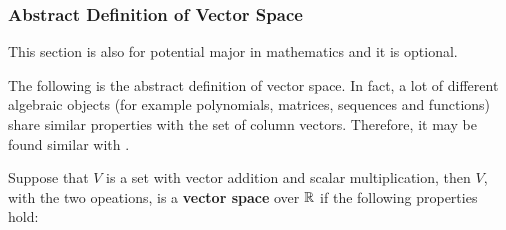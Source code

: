 \documentclass[a4paper,12pt]{article}
\begin{document}
\subsubsection{Abstract Definition of Vector Space}
\begin{cmt}
  This section is also for potential major in mathematics and it is optional.
\end{cmt}\n

The following is the abstract definition of vector space. In fact, a lot of different algebraic objects (for example polynomials, matrices, sequences and functions) share similar properties with the set of column vectors. Therefore, it may be found similar with \rpst[\sctd{1}].\n

\begin{pst}
  Suppose that $V$ is a set with vector addition and scalar multiplication, then $V$, with the two opeations, is a \textbf{vector space} over $\mathbb{R}$ if the following properties hold:


\end{pst}
\end{document}
